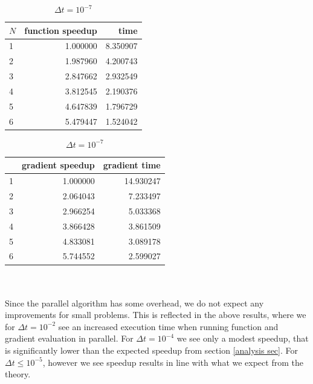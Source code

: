 \begin{table}[!h]
\centering
\caption{$\Delta t=10^{-7}$}
\label{speed_table_end}
\begin{tabular}{lrr}
\toprule
{}$N$ &  function speedup &      time \\
\midrule
1 &  1.000000 &  8.350907 \\
2 &  1.987960 &  4.200743 \\
3 &  2.847662 &  2.932549 \\
4 &  3.812545 &  2.190376 \\
5 &  4.647839 &  1.796729 \\
6 &  5.479447 &  1.524042 \\
\bottomrule
\end{tabular}
\begin{tabular}{lrr}
\toprule
{} &  gradient speedup &     gradient  time \\
\midrule
1 &  1.000000 &  14.930247 \\
2 &  2.064043 &   7.233497 \\
3 &  2.966254 &   5.033368 \\
4 &  3.866428 &   3.861509 \\
5 &  4.833081 &   3.089178 \\
6 &  5.744552 &   2.599027 \\
\bottomrule
\end{tabular}
\end{table}
\\
\\
Since the parallel algorithm has some overhead, we do not expect any improvements for small problems. This is reflected in the above results, where we for $\Delta t = 10^{-2}$ see an increased execution time when running function and gradient evaluation in parallel. For $\Delta t = 10^{-4}$ we see only a modest speedup, that is significantly lower than the expected speedup from section \ref{analysis sec}. For $\Delta t \leq 10^{-5}$, however we see speedup results in line with what we expect from the theory.  
